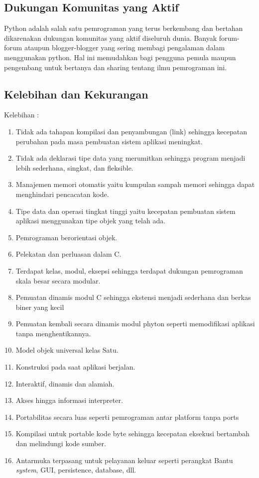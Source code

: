 \subsection{Dukungan Komunitas yang Aktif}
Python adalah salah satu pemrograman yang terus berkembang dan bertahan dikarenakan dukungan komunitas yang aktif diseluruh dunia. Banyak forum-forum ataupun blogger-blogger yang sering membagi pengalaman dalam menggunakan python. Hal ini memudahkan bagi pengguna pemula maupun pengembang untuk bertanya dan sharing tentang ilmu pemrograman ini.

\subsection{Kelebihan dan Kekurangan}
Kelebihan :
\begin{enumerate}
\item Tidak ada tahapan kompilasi dan penyambungan (link) sehingga kecepatan perubahan pada masa pembuatan sistem aplikasi meningkat.
\item Tidak ada deklarasi tipe data yang merumitkan sehingga program menjadi lebih sederhana, singkat, dan fleksible.
\item Manajemen memori otomatis yaitu kumpulan sampah memori sehingga dapat menghindari pencacatan kode.
\item Tipe data dan operasi tingkat tinggi yaitu kecepatan pembuatan sistem aplikasi menggunakan tipe objek yang telah ada.
\item Pemrograman berorientasi objek.
\item Pelekatan dan perluasan dalam C.
\item Terdapat kelas, modul, eksepsi sehingga terdapat dukungan pemrograman skala besar secara modular.
\item Pemuatan dinamis modul C sehingga ekstensi menjadi sederhana dan berkas biner yang kecil
\item Pemuatan kembali secara dinamis modul phyton seperti memodifikasi aplikasi tanpa menghentikannya.
\item Model objek universal kelas Satu.
\item Konstruksi pada saat aplikasi berjalan.
\item Interaktif, dinamis dan alamiah.
\item Akses hingga informasi interpreter.
\item Portabilitas secara luas seperti pemrograman antar platform tanpa ports
\item Kompilasi untuk portable kode byte sehingga kecepatan eksekusi bertambah dan melindungi kode sumber.
\item Antarmuka terpasang untuk pelayanan keluar seperti perangkat Bantu \textit{system}, GUI, persistence, database, dll.
\end{enumerate}
